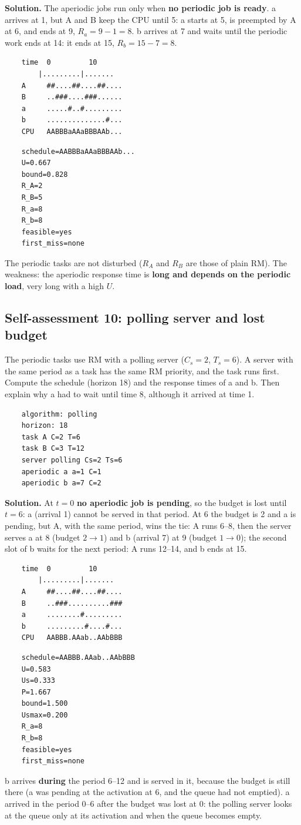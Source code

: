 \textbf{Solution.} The aperiodic jobs run only when \textbf{no periodic job is ready}. a arrives at 1, but A and B keep the CPU until 5: a starts at 5, is preempted by A at 6, and ends at 9, $R_a = 9 - 1 = 8$. b arrives at 7 and waits until the periodic work ends at 14: it ends at 15, $R_b = 15 - 7 = 8$.
\begin{verbatim}
    time  0         10
        |.........|.......
    A     ##....##....##....
    B     ..###....###......
    a     .....#..#.........
    b     ..............#...
    CPU   AABBBaAAaBBBAAb...
\end{verbatim}
\begin{verbatim}
    schedule=AABBBaAAaBBBAAb...
    U=0.667
    bound=0.828
    R_A=2
    R_B=5
    R_a=8
    R_b=8
    feasible=yes
    first_miss=none
\end{verbatim}
The periodic tasks are not disturbed ($R_A$ and $R_B$ are those of plain RM). The weakness: the aperiodic response time is \textbf{long and depends on the periodic load}, very long with a high $U$.

\subsection*{Self-assessment 10: polling server and lost budget}
The periodic tasks use RM with a polling server ($C_s = 2$, $T_s = 6$). A server with the same period as a task has the same RM priority, and the task runs first. Compute the schedule (horizon 18) and the response times of a and b. Then explain why a had to wait until time 8, although it arrived at time 1.
\begin{lstlisting}
    algorithm: polling
    horizon: 18
    task A C=2 T=6
    task B C=3 T=12
    server polling Cs=2 Ts=6
    aperiodic a a=1 C=1
    aperiodic b a=7 C=2
\end{lstlisting}

\textbf{Solution.} At $t = 0$ \textbf{no aperiodic job is pending}, so the budget is lost until $t = 6$: a (arrival 1) cannot be served in that period. At 6 the budget is 2 and a is pending, but A, with the same period, wins the tie: A runs 6--8, then the server serves a at 8 (budget $2 \to 1$) and b (arrival 7) at 9 (budget $1 \to 0$); the second slot of b waits for the next period: A runs 12--14, and b ends at 15.
\begin{verbatim}
    time  0         10
        |.........|.......
    A     ##....##....##....
    B     ..###..........###
    a     ........#.........
    b     .........#....#...
    CPU   AABBB.AAab..AAbBBB
\end{verbatim}
\begin{verbatim}
    schedule=AABBB.AAab..AAbBBB
    U=0.583
    Us=0.333
    P=1.667
    bound=1.500
    Usmax=0.200
    R_a=8
    R_b=8
    feasible=yes
    first_miss=none
\end{verbatim}
b arrives \textbf{during} the period 6--12 and is served in it, because the budget is still there (a was pending at the activation at 6, and the queue had not emptied). a arrived in the period 0--6 after the budget was lost at 0: the polling server looks at the queue only at its activation and when the queue becomes empty.

